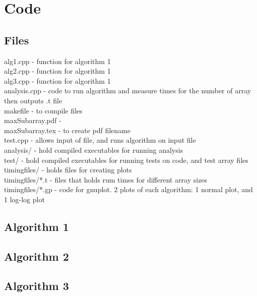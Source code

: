 \documentclass[a4paper,10pt]{article}
\begin{document}
	\newpage
	\section{Code}
		\subsection{Files}
			alg1.cpp - function for algorithm 1\\
			alg2.cpp - function for algorithm 1\\
			alg3.cpp - function for algorithm 1\\
			analysis.cpp - code to run algorithm and measure times for the number of array then outputs .t file\\
			makefile - to compile files\\
			maxSubarray.pdf - \\
			maxSubarray.tex - to create pdf filename\\
			test.cpp - allows input of file, and runs algorithm on input file\\
			analysis/ - hold compiled executables for running analysis\\
			test/ - hold compiled executables for running tests on code, and test array files\\
			timingfiles/ - holds files for creating plots\\
			timingfiles/*.t - files that holds rum times for different array sizes\\
			timingfiles/*.gp - code for gnuplot. 2 plots of each algorithm: 1 normal plot, and 1 log-log plot
		\subsection{Algorithm 1}
		
		\newpage
		\subsection{Algorithm 2}
		
		\newpage
		\subsection{Algorithm 3}
		
		
\end{document}
